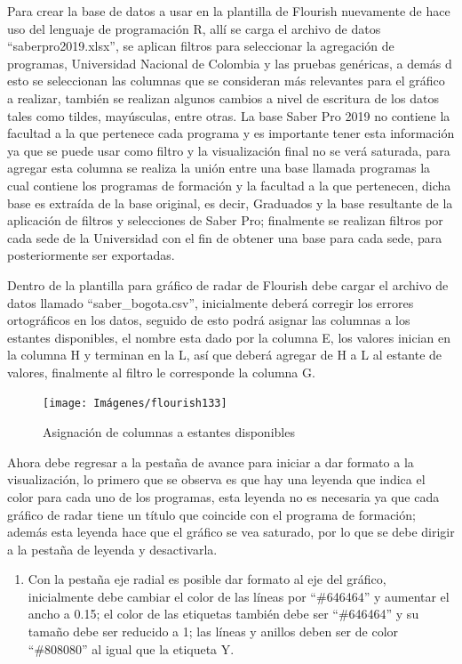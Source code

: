 \documentclass[
]{book}
\providecommand{\tightlist}{%
  \setlength{\itemsep}{0pt}\setlength{\parskip}{0pt}}
\begin{document}
Para crear la base de datos a usar en la plantilla de Flourish nuevamente de hace uso del lenguaje de programación R, allí se carga el archivo de datos ``saberpro2019.xlsx'', se aplican filtros para seleccionar la agregación de programas, Universidad Nacional de Colombia y las pruebas genéricas, a demás d esto se seleccionan las columnas que se consideran más relevantes para el gráfico a realizar, también se realizan algunos cambios a nivel de escritura de los datos tales como tildes, mayúsculas, entre otras. La base Saber Pro 2019 no contiene la facultad a la que pertenece cada programa y es importante tener esta información ya que se puede usar como filtro y la visualización final no se verá saturada, para agregar esta columna se realiza la unión entre una base llamada programas la cual contiene los programas de formación y la facultad a la que pertenecen, dicha base es extraída de la base original, es decir, Graduados y la base resultante de la aplicación de filtros y selecciones de Saber Pro; finalmente se realizan filtros por cada sede de la Universidad con el fin de obtener una base para cada sede, para posteriormente ser exportadas.

Dentro de la plantilla para gráfico de radar de Flourish debe cargar el archivo de datos llamado ``saber\_bogota.csv'', inicialmente deberá corregir los errores ortográficos en los datos, seguido de esto podrá asignar las columnas a los estantes disponibles, el nombre esta dado por la columna E, los valores inician en la columna H y terminan en la L, así que deberá agregar de H a L al estante de valores, finalmente al filtro le corresponde la columna G.

\begin{figure}

{\centering \texttt{[image: Imágenes/flourish133]} 

}

\caption{Asignación de columnas a estantes disponibles}\label{fig:asignarcolumnasradarflourish-fig}
\end{figure}

Ahora debe regresar a la pestaña de avance para iniciar a dar formato a la visualización, lo primero que se observa es que hay una leyenda que indica el color para cada uno de los programas, esta leyenda no es necesaria ya que cada gráfico de radar tiene un título que coincide con el programa de formación; además esta leyenda hace que el gráfico se vea saturado, por lo que se debe dirigir a la pestaña de leyenda y desactivarla.

\begin{enumerate}
\def\labelenumi{\arabic{enumi}.}
\tightlist
\item
  Con la pestaña eje radial es posible dar formato al eje del gráfico, inicialmente debe cambiar el color de las líneas por ``\#646464'' y aumentar el ancho a 0.15; el color de las etiquetas también debe ser ``\#646464'' y su tamaño debe ser reducido a 1; las líneas y anillos deben ser de color ``\#808080'' al igual que la etiqueta Y.
\end{enumerate}
\end{document}
